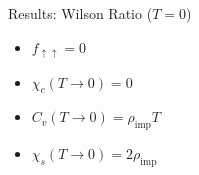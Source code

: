 \documentclass[aspectratio=169]{beamer}
\begin{document}
\begin{frame}{Results: Wilson Ratio (\(T=0\))}
	\begin{center}
\end{center}
\vspace*{\fill}
\begin{minipage}{0.45\textwidth}
\begin{itemize}
	\item \(f_{\uparrow\uparrow} =0\)
	\item \(\chi_c(T\to 0) =0\)
\end{itemize}
\end{minipage}
\begin{minipage}{0.2\textwidth}
	\scalebox{2}{$\longrightarrow$}
\end{minipage}
\begin{minipage}{0.33\textwidth}
\begin{itemize}
	\item \(C_v(T\to 0) = \rho_\text{imp}T\)
	\item \(\chi_s(T \to 0) = 2\rho_\text{imp}\)
\end{itemize}
\end{minipage}
\vspace*{\fill}
\begin{center}
\end{center}
\end{frame}
\end{document}
